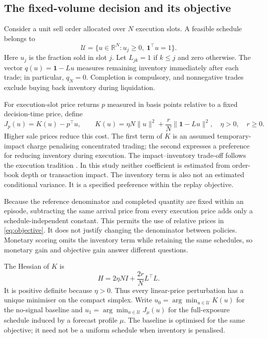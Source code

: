 \subsection{The fixed-volume decision and its objective}
Consider a unit sell order allocated over $N$ execution slots. A feasible schedule belongs to
\[
 \mathcal U=\{u\in\mathbb R^N:u_j\geq0,\ \mathbf1^\top u=1\}.
\]
Here $u_j$ is the fraction sold in slot $j$. Let $L_{jk}=1$ if $k\leq j$ and zero otherwise. The vector $q(u)=\mathbf1-Lu$ measures remaining inventory immediately after each trade; in particular, $q_N=0$. Completion is compulsory, and nonnegative trades exclude buying back inventory during liquidation.

For execution-slot price returns $p$ measured in basis points relative to a fixed decision-time price, define
\begin{equation}
 J_p(u)=K(u)-p^\top u,\qquad
 K(u)=\eta N\|u\|^2+\frac rN\|\mathbf1-Lu\|^2,
 \quad \eta>0,\quad r\geq0.
 \label{eq:objective}
\end{equation}
Higher sale prices reduce this cost. The first term of $K$ is an assumed temporary-impact charge penalising concentrated trading; the second expresses a preference for reducing inventory during execution. The impact--inventory trade-off follows the execution tradition \citep{almgren2001}. In this study neither coefficient is estimated from order-book depth or transaction impact. The inventory term is also not an estimated conditional variance. It is a specified preference within the replay objective.

Because the reference denominator and completed quantity are fixed within an episode, subtracting the same arrival price from every execution price adds only a schedule-independent constant. This permits the use of relative prices in \eqref{eq:objective}. It does not justify changing the denominator between policies. Monetary scoring omits the inventory term while retaining the same schedules, so monetary gain and objective gain answer different questions.

The Hessian of $K$ is
\[
 H=2\eta NI+\frac{2r}{N}L^\top L.
\]
It is positive definite because $\eta>0$. Thus every linear-price perturbation has a unique minimiser on the compact simplex. Write $u_0=\arg\min_{u\in\mathcal U}K(u)$ for the no-signal baseline and $u_1=\arg\min_{u\in\mathcal U}J_\mu(u)$ for the full-exposure schedule induced by a forecast profile $\mu$. The baseline is optimised for the same objective; it need not be a uniform schedule when inventory is penalised.

